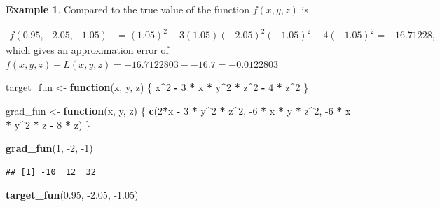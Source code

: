 \documentclass[
]{book}
\newenvironment{Shaded}{\begin{snugshade}}{\end{snugshade}}
\newcommand{\ControlFlowTok}[1]{\textcolor[rgb]{0.13,0.29,0.53}{\textbf{#1}}}
\newcommand{\DecValTok}[1]{\textcolor[rgb]{0.00,0.00,0.81}{#1}}
\newcommand{\FloatTok}[1]{\textcolor[rgb]{0.00,0.00,0.81}{#1}}
\newcommand{\KeywordTok}[1]{\textcolor[rgb]{0.13,0.29,0.53}{\textbf{#1}}}
\newcommand{\NormalTok}[1]{#1}
\newcommand{\OperatorTok}[1]{\textcolor[rgb]{0.81,0.36,0.00}{\textbf{#1}}}
\newcommand{\StringTok}[1]{\textcolor[rgb]{0.31,0.60,0.02}{#1}}
\theoremstyle{definition}
\theoremstyle{definition}
\newtheorem{example}{Example}[chapter]
\theoremstyle{definition}
\theoremstyle{definition}
\theoremstyle{remark}
\begin{document}
\begin{example}
Compared to the true value of the function \(f(x, y, z)\) is

\[
\begin{aligned}
f(0.95, -2.05, -1.05) & = (1.05)^2 - 3(1.05)(-2.05)^2(-1.05)^2 - 4(-1.05)^2 = -16.71228,
\end{aligned}
\]
which gives an approximation error of \(f(x, y, z) - L(x, y, z) = -16.7122803 - -16.7 = -0.0122803\)

\begin{Shaded}
\begin{Highlighting}[]
\NormalTok{target_fun <-}\StringTok{ }\ControlFlowTok{function}\NormalTok{(x, y, z) \{}
\NormalTok{        x}\OperatorTok{^}\DecValTok{2} \OperatorTok{-}\StringTok{ }\DecValTok{3} \OperatorTok{*}\StringTok{ }\NormalTok{x }\OperatorTok{*}\StringTok{ }\NormalTok{y}\OperatorTok{^}\DecValTok{2} \OperatorTok{*}\StringTok{ }\NormalTok{z}\OperatorTok{^}\DecValTok{2} \OperatorTok{-}\StringTok{ }\DecValTok{4} \OperatorTok{*}\StringTok{ }\NormalTok{z}\OperatorTok{^}\DecValTok{2}
\NormalTok{\} }
        
\NormalTok{grad_fun <-}\StringTok{ }\ControlFlowTok{function}\NormalTok{(x, y, z) \{}
        \KeywordTok{c}\NormalTok{(}\DecValTok{2}\OperatorTok{*}\NormalTok{x }\OperatorTok{-}\StringTok{ }\DecValTok{3} \OperatorTok{*}\StringTok{ }\NormalTok{y}\OperatorTok{^}\DecValTok{2} \OperatorTok{*}\StringTok{ }\NormalTok{z}\OperatorTok{^}\DecValTok{2}\NormalTok{,}
          \DecValTok{-6} \OperatorTok{*}\StringTok{ }\NormalTok{x }\OperatorTok{*}\StringTok{ }\NormalTok{y }\OperatorTok{*}\StringTok{ }\NormalTok{z}\OperatorTok{^}\DecValTok{2}\NormalTok{,}
          \DecValTok{-6} \OperatorTok{*}\StringTok{ }\NormalTok{x }\OperatorTok{*}\StringTok{ }\NormalTok{y}\OperatorTok{^}\DecValTok{2} \OperatorTok{*}\StringTok{ }\NormalTok{z }\OperatorTok{-}\StringTok{ }\DecValTok{8} \OperatorTok{*}\StringTok{ }\NormalTok{z)}
\NormalTok{\}}

\KeywordTok{grad_fun}\NormalTok{(}\DecValTok{1}\NormalTok{, }\DecValTok{-2}\NormalTok{, }\DecValTok{-1}\NormalTok{)}
\end{Highlighting}
\end{Shaded}

\begin{verbatim}
## [1] -10  12  32
\end{verbatim}

\begin{Shaded}
\begin{Highlighting}[]
\KeywordTok{target_fun}\NormalTok{(}\FloatTok{0.95}\NormalTok{, }\FloatTok{-2.05}\NormalTok{, }\FloatTok{-1.05}\NormalTok{)}
\end{Highlighting}
\end{Shaded}


\end{example}
\end{document}
